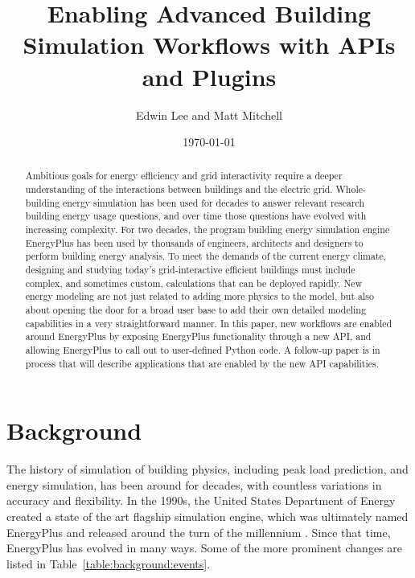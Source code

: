 \documentclass[5p, authoryear]{elsarticle}
\title{Enabling Advanced Building Simulation Workflows with APIs and Plugins}
\author{Edwin Lee and Matt Mitchell}
\date{\today}
\begin{document}
  
\begin{abstract}
Ambitious goals for energy efficiency and grid interactivity require a deeper understanding of the interactions between buildings and the electric grid.  
Whole-building energy simulation has been used for decades to answer relevant research building energy usage questions, and over time those questions have evolved with increasing complexity.  
For two decades, the program building energy simulation engine EnergyPlus has been used by thousands of engineers, architects and designers to perform building energy analysis.  
To meet the demands of the current energy climate, designing and studying today's grid-interactive efficient buildings must include complex, and sometimes custom, calculations that can be deployed rapidly.  
New energy modeling are not just related to adding more physics to the model, but also about opening the door for a broad user base to add their own detailed modeling capabilities in a very straightforward manner.  
In this paper, new workflows are enabled around EnergyPlus by exposing EnergyPlus functionality through a new API, and allowing EnergyPlus to call out to user-defined Python code.  
A follow-up paper is in process that will describe applications that are enabled by the new API capabilities.
\end{abstract}

\maketitle
 
\section{Background}

The history of simulation of building physics, including peak load prediction, and energy simulation, has been around for decades, \citep{Mao2018} with countless variations in accuracy and flexibility.  
In the 1990s, the United States Department of Energy created a state of the art flagship simulation engine, which was ultimately named EnergyPlus and released around the turn of the millennium \citep{Crawley2001}.  
Since that time, EnergyPlus has evolved in many ways.   
Some of the more prominent changes are listed in Table~\ref{table:background:events}.
\end{document}
